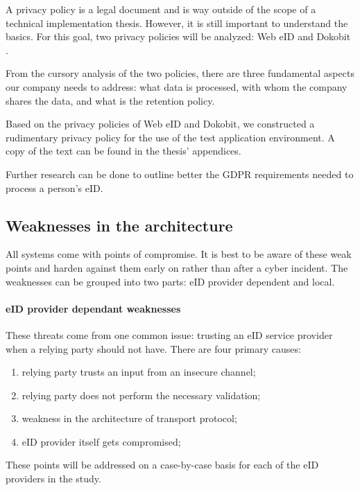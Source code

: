 A privacy policy is a legal document and is way outside of the scope of a technical implementation thesis. However, it is still important to understand the basics. For this goal, two privacy policies will be analyzed: Web eID \cite{legal-webeid-privacypolicy} and Dokobit \cite{legal-dokobit-privacypolicy}.

From the cursory analysis of the two policies, there are three fundamental aspects our company needs to address: what data is processed, with whom the company shares the data, and what is the retention policy.

Based on the privacy policies of Web eID and Dokobit, we constructed a rudimentary privacy policy for the use of the test application environment. A copy of the text can be found in the thesis' appendices.

Further research can be done to outline better the GDPR requirements needed to process a person's eID.

\subsection{Weaknesses in the architecture}

All systems come with points of compromise. It is best to be aware of these weak points and harden against them early on rather than after a cyber incident. The weaknesses can be grouped into two parts: eID provider dependent and local.

\paragraph{eID provider dependant weaknesses}

These threats come from one common issue: trusting an eID service provider when a relying party should not have. There are four primary causes:

\begin{enumerate}
  \item relying party trusts an input from an insecure channel;
  \item relying party does not perform the necessary validation;
  \item weakness in the architecture of transport protocol;
  \item eID provider itself gets compromised;
\end{enumerate}

These points will be addressed on a case-by-case basis for each of the eID providers in the study.

